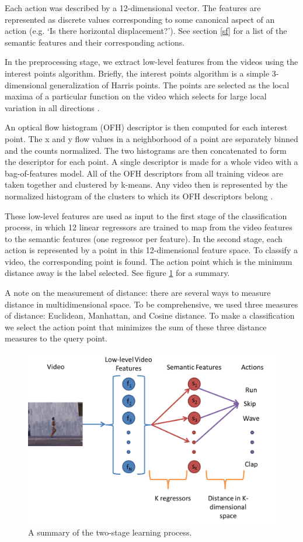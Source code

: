 \documentclass{article}
\begin{document}
Each action was described by a 12-dimensional vector. The features are represented as discrete values corresponding to some canonical aspect of an action (e.g. `Is there horizontal displacement?'). See section \ref{sf} for a list of the semantic features and their corresponding actions.

In the preprocessing stage, we extract low-level features from the videos using the interest points algorithm. Briefly, the interest points algorithm is a simple 3-dimensional generalization of Harris points. The points are selected as the local maxima of a particular function on the video which selects for large local variation in all directions \cite{Laptev05}.

An optical flow histogram (OFH) descriptor is then computed for each interest point. The x and y flow values in a neighborhood of a point are separately binned and the counts normalized. The two histograms are then concatenated to form the descriptor for each point. A single descriptor is made for a whole video with a bag-of-features model. All of the OFH descriptors from all training videos are taken together and clustered by k-means. Any video then is represented by the normalized histogram of the clusters to which its OFH descriptors belong \cite{Laptev04}.

These low-level features are used as input to the first stage of the classification process, in which 12 linear regressors are trained to map from the video features to the semantic features (one regressor per feature).  In the second stage, each action is represented by a point in this 12-dimensional feature space. To classify a video, the corresponding point is found. The action point which is the minimum distance away is the label selected. See figure \ref{2stage} for a summary.

A note on the measurement of distance: there are several ways to measure distance in multidimensional space. To be comprehensive, we used three measures of distance: Euclidean, Manhattan, and Cosine distance. To make a classification we select the action point that minimizes the sum of these three distance measures to the query point.
\begin{figure}[h]
\centering
\includegraphics[width=.3\linewidth]{2stagelearning.png}
\caption{A summary of the two-stage learning process.}
\label{2stage}
\end{figure}
\end{document}
